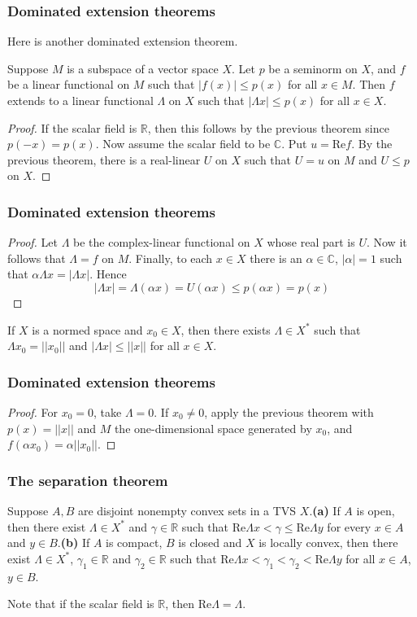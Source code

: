 \documentclass{beamer}
\begin{document}
\begin{frame}
\frametitle{Dominated extension theorems}
Here is another dominated extension theorem.
\begin{theorem}
    Suppose $M$ is a subspace of a vector space $X$. Let $p$ be a seminorm on $X$, and $f$ be a linear functional on $M$ such that $|f(x)| \leq p(x)$ for all $x\in M$. Then $f$ extends to a linear functional $\Lambda$ on $X$ such that $|\Lambda x| \leq p(x)$ for all $x\in X$.
\end{theorem}
\begin{proof}\renewcommand{\qedsymbol}{}
    If the scalar field is $\mathbb{R}$, then this follows by the previous theorem since $p(-x) = p(x)$. Now assume the scalar field to be $\mathbb{C}$. Put $u = \text{Re}f$. By the previous theorem, there is a real-linear $U$ on $X$ such that $U = u$ on $M$ and $U \leq p$ on $X$.
\end{proof}
\end{frame}
\begin{frame}
\frametitle{Dominated extension theorems}
\begin{proof}
    Let $\Lambda$ be the complex-linear functional on $X$ whose real part is $U$. Now it follows that $\Lambda = f$ on $M$. Finally, to each $x \in X$ there is an $\alpha \in \mathbb{C}$, $|\alpha| = 1$ such that $\alpha\Lambda x = |\Lambda x|$. Hence \[|\Lambda x| = \Lambda(\alpha x) = U(\alpha x) \leq p(\alpha x) = p(x)\]
\end{proof}
\begin{corollary}
    If $X$ is a normed space and $x_0 \in X$, then there exists $\Lambda \in X^*$ such that $\Lambda x_0 = ||x_0||$ and $|\Lambda x| \leq ||x||$ for all $x\in X$.
\end{corollary}
\end{frame}
\begin{frame}
\frametitle{Dominated extension theorems}
\begin{proof}
    For $x_0 = 0$, take $\Lambda = 0$. If $x_0 \neq 0$, apply the previous theorem with $p(x) = ||x||$ and $M$ the one-dimensional space generated by $x_0$, and $f(\alpha x_0) = \alpha||x_0||$.
\end{proof}
\end{frame}
\begin{frame}
\frametitle{The separation theorem}
\begin{theorem}
    Suppose $A,B$ are disjoint nonempty convex sets in a TVS $X$.\newline\newline \textbf{(a)} If $A$ is open, then there exist $\Lambda \in X^*$ and $\gamma \in \mathbb{R}$ such that $\text{Re}\Lambda x < \gamma \leq \text{Re}\Lambda y$ for every $x \in A$ and $y \in B$.\newline\newline \textbf{(b)} If $A$ is compact, $B$ is closed and $X$ is locally convex, then there exist $\Lambda \in X^*$, $\gamma_1 \in \mathbb{R}$ and $\gamma_2 \in \mathbb{R}$ such that $\text{Re}\Lambda x < \gamma_1 < \gamma_2 < \text{Re}\Lambda y$ for all $x \in A$, $y \in B$.
\end{theorem}
Note that if the scalar field is $\mathbb{R}$, then Re$\Lambda = \Lambda$.
\end{frame}
\end{document}
